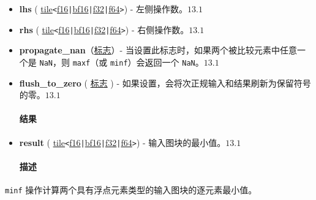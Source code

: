 \documentclass{article}
\begin{document}
\begin{itemize}
\item \textbf{lhs} ( \href{https://docs.nvidia.com/cuda/tile-ir/latest/sections/types.html#type-tile}{tile}\texttt{<}\href{https://docs.nvidia.com/cuda/tile-ir/latest/sections/types.html#subsection-element-types}{f16}\texttt{|}\href{https://docs.nvidia.com/cuda/tile-ir/latest/sections/types.html#subsection-element-types}{bf16}\texttt{|}\href{https://docs.nvidia.com/cuda/tile-ir/latest/sections/types.html#subsection-element-types}{f32}\texttt{|}\href{https://docs.nvidia.com/cuda/tile-ir/latest/sections/types.html#subsection-element-types}{f64}\texttt{>}) - 左侧操作数。$\boxed{13.1}$
\item \textbf{rhs} ( \href{https://docs.nvidia.com/cuda/tile-ir/latest/sections/types.html#type-tile}{tile}\texttt{<}\href{https://docs.nvidia.com/cuda/tile-ir/latest/sections/types.html#subsection-element-types}{f16}\texttt{|}\href{https://docs.nvidia.com/cuda/tile-ir/latest/sections/types.html#subsection-element-types}{bf16}\texttt{|}\href{https://docs.nvidia.com/cuda/tile-ir/latest/sections/types.html#subsection-element-types}{f32}\texttt{|}\href{https://docs.nvidia.com/cuda/tile-ir/latest/sections/types.html#subsection-element-types}{f64}\texttt{>}) - 右侧操作数。$\boxed{13.1}$
\item \textbf{propagate\_nan}（\href{https://docs.nvidia.com/cuda/tile-ir/latest/sections/operations.html#type-flag}{标志}）- 当设置此标志时，如果两个被比较元素中任意一个是 \texttt{NaN}，则 \texttt{maxf}（或 \texttt{minf}）会返回一个 \texttt{NaN}。$\boxed{13.1}$
\item \textbf{flush\_to\_zero} ( \href{https://docs.nvidia.com/cuda/tile-ir/latest/sections/operations.html#type-flag}{标志} ) - 如果设置，会将次正规输入和结果刷新为保留符号的零。$\boxed{13.1}$




\paragraph{结果}


\item \textbf{result} ( \href{https://docs.nvidia.com/cuda/tile-ir/latest/sections/types.html#type-tile}{tile}\texttt{<}\href{https://docs.nvidia.com/cuda/tile-ir/latest/sections/types.html#subsection-element-types}{f16}\texttt{|}\href{https://docs.nvidia.com/cuda/tile-ir/latest/sections/types.html#subsection-element-types}{bf16}\texttt{|}\href{https://docs.nvidia.com/cuda/tile-ir/latest/sections/types.html#subsection-element-types}{f32}\texttt{|}\href{https://docs.nvidia.com/cuda/tile-ir/latest/sections/types.html#subsection-element-types}{f64}\texttt{>}) - 输入图块的最小值。$\boxed{13.1}$




\paragraph{描述}


\end{itemize}
\texttt{minf} 操作计算两个具有浮点元素类型的输入图块的逐元素最小值。
\end{document}
